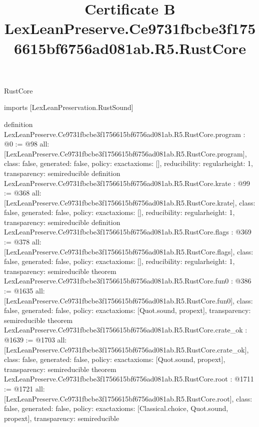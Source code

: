 \begin{lexlean}{RustCore}
\title{Certificate B LexLeanPreserve.Ce9731fbcbe3f1756615bf6756ad081ab.R5.RustCore}
\begin{coremodule}
imports [LexLeanPreservation.RustSound]

definition LexLeanPreserve.Ce9731fbcbe3f1756615bf6756ad081ab.R5.RustCore.program : @0 := @98 {
  all: [LexLeanPreserve.Ce9731fbcbe3f1756615bf6756ad081ab.R5.RustCore.program],
  class: false,
  generated: false,
  policy: exact{axioms: []},
  reducibility: regular{height: 1},
  transparency: semireducible
}
definition LexLeanPreserve.Ce9731fbcbe3f1756615bf6756ad081ab.R5.RustCore.krate : @99 := @368 {
  all: [LexLeanPreserve.Ce9731fbcbe3f1756615bf6756ad081ab.R5.RustCore.krate],
  class: false,
  generated: false,
  policy: exact{axioms: []},
  reducibility: regular{height: 1},
  transparency: semireducible
}
definition LexLeanPreserve.Ce9731fbcbe3f1756615bf6756ad081ab.R5.RustCore.flags : @369 := @378 {
  all: [LexLeanPreserve.Ce9731fbcbe3f1756615bf6756ad081ab.R5.RustCore.flags],
  class: false,
  generated: false,
  policy: exact{axioms: []},
  reducibility: regular{height: 1},
  transparency: semireducible
}
theorem LexLeanPreserve.Ce9731fbcbe3f1756615bf6756ad081ab.R5.RustCore.fun0 : @386 := @1635 {
  all: [LexLeanPreserve.Ce9731fbcbe3f1756615bf6756ad081ab.R5.RustCore.fun0],
  class: false,
  generated: false,
  policy: exact{axioms: [Quot.sound, propext]},
  transparency: semireducible
}
theorem LexLeanPreserve.Ce9731fbcbe3f1756615bf6756ad081ab.R5.RustCore.crate_ok : @1639 := @1703 {
  all: [LexLeanPreserve.Ce9731fbcbe3f1756615bf6756ad081ab.R5.RustCore.crate_ok],
  class: false,
  generated: false,
  policy: exact{axioms: [Quot.sound, propext]},
  transparency: semireducible
}
theorem LexLeanPreserve.Ce9731fbcbe3f1756615bf6756ad081ab.R5.RustCore.root : @1711 := @1721 {
  all: [LexLeanPreserve.Ce9731fbcbe3f1756615bf6756ad081ab.R5.RustCore.root],
  class: false,
  generated: false,
  policy: exact{axioms: [Classical.choice, Quot.sound, propext]},
  transparency: semireducible
}


\end{coremodule}
\end{lexlean}
